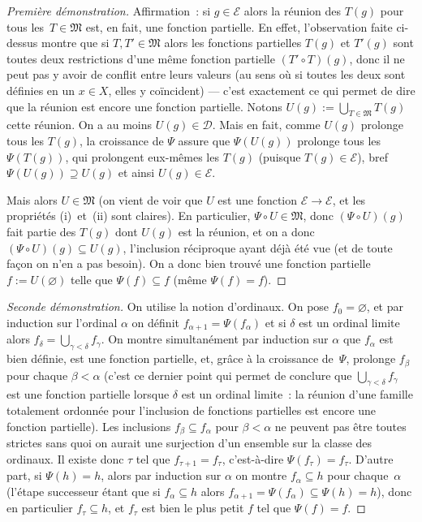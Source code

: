 \documentclass[12pt,a4paper]{article}
\theoremstyle{definition}
\begin{document}
\begin{proof}[Première démonstration]
Affirmation : si $g \in \mathscr{E}$ alors la réunion des $T(g)$ pour
tous les $T\in\mathfrak{M}$ est, en fait, une fonction partielle.  En
effet, l'observation faite ci-dessus montre que si $T, T' \in
\mathfrak{M}$ alors les fonctions partielles $T(g)$ et $T'(g)$ sont
toutes deux restrictions d'une même fonction partielle $(T'\circ
T)(g)$, donc il ne peut pas y avoir de conflit entre leurs valeurs (au
sens où si toutes les deux sont définies en un $x\in X$, elles y
coïncident) — c'est exactement ce qui permet de dire que la réunion
est encore une fonction partielle.  Notons $U(g) :=
\bigcup_{T\in\mathfrak{M}} T(g)$ cette réunion.  On a au moins $U(g)
\in \mathscr{D}$.  Mais en fait, comme $U(g)$ prolonge tous les
$T(g)$, la croissance de $\Psi$ assure que $\Psi(U(g))$ prolonge tous
les $\Psi(T(g))$, qui prolongent eux-mêmes les $T(g)$ (puisque $T(g)
\in \mathscr{E}$), bref $\Psi(U(g)) \supseteq U(g)$ et ainsi $U(g) \in
\mathscr{E}$.

Mais alors $U \in \mathfrak{M}$ (on vient de voir que $U$ est une
fonction $\mathscr{E}\to\mathscr{E}$, et les propriétés (i) et (ii)
sont claires).  En particulier, $\Psi\circ U \in \mathfrak{M}$, donc
$(\Psi\circ U)(g)$ fait partie des $T(g)$ dont $U(g)$ est la réunion,
et on a donc $(\Psi\circ U)(g) \subseteq U(g)$, l'inclusion réciproque
ayant déjà été vue (et de toute façon on n'en a pas besoin).  On a
donc bien trouvé une fonction partielle $f := U(\varnothing)$ telle
que $\Psi(f) \subseteq f$ (même $\Psi(f) = f$).
\end{proof}

\begin{proof}[Seconde démonstration]
On utilise la notion d'ordinaux.  On pose $f_0 = \varnothing$, et par
induction sur l'ordinal $\alpha$ on définit $f_{\alpha+1} =
\Psi(f_\alpha)$ et si $\delta$ est un ordinal limite alors $f_\delta =
\bigcup_{\gamma<\delta} f_\gamma$.  On montre simultanément par
induction sur $\alpha$ que $f_\alpha$ est bien définie, est une
fonction partielle, et, grâce à la croissance de $\Psi$, prolonge
$f_\beta$ pour chaque $\beta<\alpha$ (c'est ce dernier point qui
permet de conclure que $\bigcup_{\gamma<\delta} f_\gamma$ est une
fonction partielle lorsque $\delta$ est un ordinal limite : la réunion
d'une famille totalement ordonnée pour l'inclusion de fonctions
partielles est encore une fonction partielle).  Les inclusions
$f_\beta \subseteq f_\alpha$ pour $\beta<\alpha$ ne peuvent pas être
toutes strictes sans quoi on aurait une surjection d'un ensemble sur
la classe des ordinaux.  Il existe donc $\tau$ tel que $f_{\tau+1} =
f_\tau$, c'est-à-dire $\Psi(f_\tau) = f_\tau$.  D'autre part, si
$\Psi(h) = h$, alors par induction sur $\alpha$ on montre $f_\alpha
\subseteq h$ pour chaque $\alpha$ (l'étape successeur étant que si
$f_\alpha \subseteq h$ alors $f_{\alpha+1} = \Psi(f_\alpha) \subseteq
\Psi(h) = h$), donc en particulier $f_\tau \subseteq h$, et $f_\tau$
est bien le plus petit $f$ tel que $\Psi(f) = f$.
\end{proof}
\end{document}
